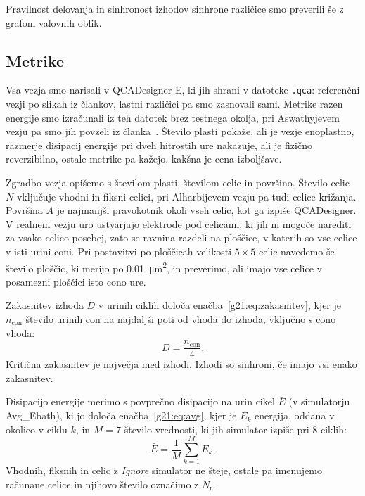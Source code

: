 Pravilnost delovanja in sinhronost izhodov sinhrone različice smo preverili še z grafom valovnih oblik.

\subsection{Metrike}
\label{g21:sec:metrike}

Vsa vezja smo narisali v QCADesigner-E, ki jih shrani v datoteke \texttt{.qca}: referenčni vezji po slikah iz člankov, lastni različici pa smo zasnovali sami. Metrike razen energije smo izračunali iz teh datotek brez testnega okolja, pri Aswathyjevem vezju pa smo jih povzeli iz članka~\cite{g21:aswathy2024}. Število plasti pokaže, ali je vezje enoplastno, razmerje disipacij energije pri dveh hitrostih ure nakazuje, ali je fizično reverzibilno, ostale metrike pa kažejo, kakšna je cena izboljšave.

Zgradbo vezja opišemo s številom plasti, številom celic in površino. Število celic $N$ vključuje vhodni in fiksni celici, pri Alharbijevem vezju pa tudi celice križanja. Površina $A$ je najmanjši pravokotnik okoli vseh celic, kot ga izpiše QCADesigner. V realnem vezju uro ustvarjajo elektrode pod celicami, ki jih ni mogoče narediti za vsako celico posebej, zato se ravnina razdeli na ploščice, v katerih so vse celice v isti urini coni. Pri postavitvi po ploščicah velikosti $5\times5$ celic navedemo še število ploščic, ki merijo po \SI{0.01}{\micro\metre\squared}, in preverimo, ali imajo vse celice v posamezni ploščici isto cono ure.

Zakasnitev izhoda $D$ v urinih ciklih določa enačba~\eqref{g21:eq:zakasnitev}, kjer je $n_\mathrm{con}$ število urinih con na najdaljši poti od vhoda do izhoda, vključno s cono vhoda:
\begin{equation}
D = \frac{n_\mathrm{con}}{4}.
\label{g21:eq:zakasnitev}
\end{equation}
Kritična zakasnitev je največja med izhodi. Izhodi so sinhroni, če imajo vsi enako zakasnitev.

Disipacijo energije merimo s povprečno disipacijo na urin cikel $\bar{E}$ (v simulatorju Avg\_Ebath), ki jo določa enačba~\eqref{g21:eq:avg}, kjer je $E_k$ energija, oddana v okolico v ciklu $k$, in $M = 7$ število vrednosti, ki jih simulator izpiše pri 8 ciklih:
\begin{equation}
\bar{E} = \frac{1}{M}\sum_{k=1}^{M} E_k.
\label{g21:eq:avg}
\end{equation}
Vhodnih, fiksnih in celic z \emph{Ignore} simulator ne šteje, ostale pa imenujemo računane celice in njihovo število označimo z $N_\mathrm{r}$.

